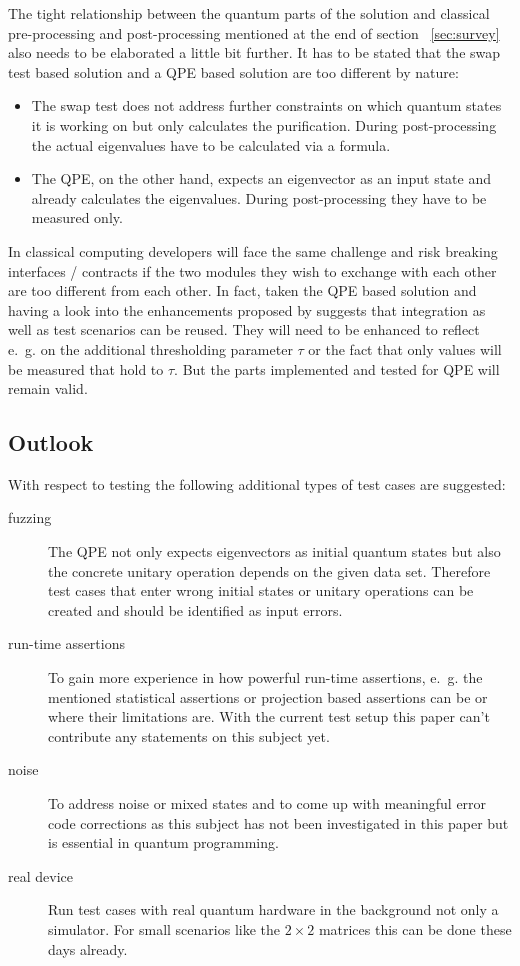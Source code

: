 The tight relationship between the quantum parts of the solution and classical pre-processing and post-processing mentioned at the end of section ~\ref{sec:survey} also needs to be elaborated a little bit further. It has to be stated that the swap test based solution and a QPE based solution are too different by nature:
\begin{itemize}
  \item The swap test does not address further constraints on which quantum states it is working on but only calculates the purification. During post-processing the actual eigenvalues have to be calculated via a formula.
  \item The QPE, on the other hand, expects an eigenvector as an input state and already calculates the eigenvalues. During post-processing they have to be measured only.
\end{itemize}
In classical computing developers will face the same challenge and risk breaking interfaces / contracts if the two modules they wish to exchange with each other are too different from each other. In fact, taken the QPE based solution and having a look into the enhancements proposed by \cite{He_2021} suggests that integration as well as test scenarios can be reused. They will need to be enhanced to reflect e.~g. on the additional thresholding parameter $\tau$ or the fact that only values will be measured that hold to $\tau$. But the parts implemented and tested for QPE will remain valid.

\subsection{Outlook}
\label{subsec:outlook}
With respect to testing the following additional types of test cases are suggested:
\begin{description}
  \item [fuzzing] The QPE not only expects eigenvectors as initial quantum states but also the concrete unitary operation depends on the given data set. Therefore test cases that enter wrong initial states or unitary operations can be created and should be identified as input errors.
  \item [run-time assertions] To gain more experience in how powerful run-time assertions, e.~g. the mentioned statistical assertions or projection based assertions can be or where their limitations are. With the current test setup this paper can't contribute any statements on this subject yet.
  \item [noise] To address noise or mixed states and to come up with meaningful error code corrections as this subject has not been investigated in this paper but is essential in quantum programming.
  \item [real device] Run test cases with real quantum hardware in the background not only a simulator. For small scenarios like the $2 \times 2$ matrices this can be done these days already.
\end{description}

